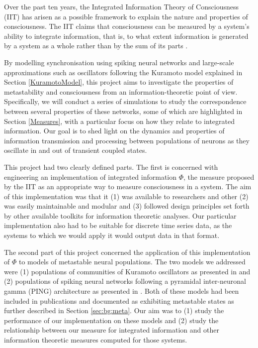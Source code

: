 \documentclass[a4paper,11pt]{article}
\begin{document}
Over the past ten years, the Integrated Information Theory of Consciousness (IIT) has arisen as a possible framework to explain the nature and properties of consciousness. The IIT claims that consciousness can be measured by a system's ability to integrate information, that is, to what extent information is generated by a system as a whole rather  than by the sum of its parts \cite{Tononi2003}.

By modelling synchronisation using spiking neural networks and large-scale approximations such as oscillators following the Kuramoto model explained in Section \ref{KuramotoModel}, this project aims to investigate the properties of metastability and consciousness from an information-theoretic point of view. Specifically, we will conduct a series of simulations to study the correspondence between several properties of these networks, some of which are highlighted in Section \ref{Measures}, with a particular focus on how they relate to integrated information. Our goal is to shed light on the dynamics and properties of information transmission and processing between populations of neurons as they oscillate in and out of transient coupled states.

This project had two clearly defined parts. The first is concerned with engineering an implementation of integrated information $\Phi$, the measure proposed by the IIT as an appropriate way to measure consciousness in a system. The aim of this implementation was that it (1) was available to researchers and other (2) was easily maintainable and modular and (3) followed design principles set forth by other available toolkits for information theoretic analyses. Our particular implementation also had to be suitable for discrete time series data, as the systems to which we would apply it would output data in that format.

The second part of this project concerned the application of this implementation of $\Phi$ to models of metastable neural populations. The two models we addressed were (1) populations of communities of Kuramoto oscillators as presented in \cite{Shanahan2010} and (2) populations of spiking neural networks following a pyramidal inter-neuronal gamma (PING) architecture as presented in \cite{Bhowmik2013}. Both of these models had been included in publications and documented as exhibiting metastable states as further described in Section \ref{sec:bg:meta}. Our aim was to (1) study the performance of our implementation on these models and (2) study the relationship between our measure for integrated information and other information theoretic measures computed for those systems. 
\end{document}
